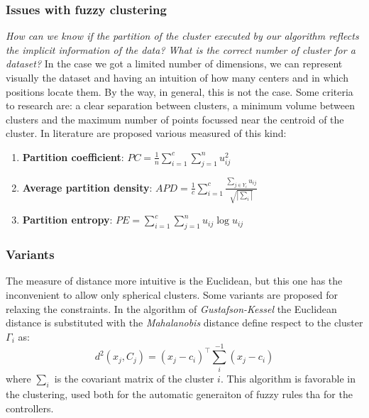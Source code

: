 \documentclass{article}
\begin{document}
\subsubsection{Issues with fuzzy clustering}
\textit{How can we know if the partition of the cluster executed by
    our algorithm reflects the implicit information of the data? What is the
    correct number of cluster for a dataset?} In the case we got a limited number of
dimensions, we can represent visually the dataset and having an intuition of
how many centers and in which positions locate them. By the way, in general,
this is not the case.
\newline\newline
Some criteria to research are: a clear separation between clusters, a minimum
volume between clusters and the maximum number of points focussed near the centroid
of the cluster. In literature are proposed various measured of this kind:
\begin{enumerate}
    \item \textbf{Partition coefficient}: $PC=\frac{1}{n}\sum_{i=1}^c\sum_{j=1}^n u^2_{ij}$
    \item \textbf{Average partition density}: $APD=\frac{1}{c}\sum_{i=1}^c \frac{\sum_{j\in Y_i} u_{ij}}{\sqrt{|\sum_i|}}$
    \item \textbf{Partition entropy}: $PE=\sum_{i=1}^c\sum_{j=1}^n u_{ij}\log u_{ij}$
\end{enumerate}

\subsubsection{Variants}
The measure of distance more intuitive is the Euclidean, but this one has the inconvenient
to allow only spherical clusters. Some variants are proposed for relaxing the constraints.
In the algorithm of \textit{Gustafson-Kessel} the Euclidean distance is substituted with the
\textit{Mahalanobis} distance define respect to the cluster $\Gamma_i$ as:
$$d^2(x_j,C_j)=(x_j-c_i)^\top\sum_i^{-1}(x_j-c_i)$$
where $\sum_i$ is the covariant matrix of the cluster $i$. This algorithm is favorable
in the clustering, used both for the automatic generaiton of fuzzy rules tha for the controllers.
\end{document}
